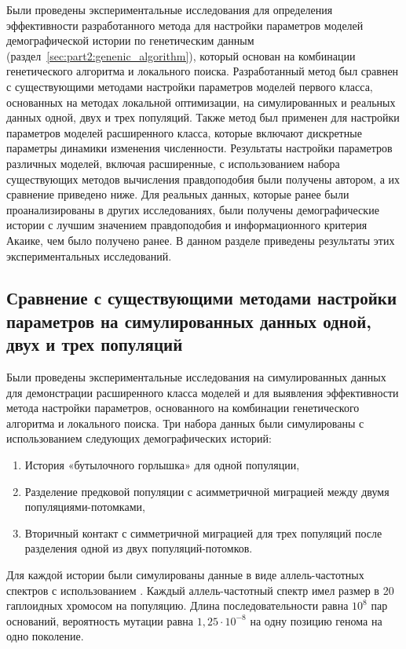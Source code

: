Были проведены экспериментальные исследования для определения эффективности разработанного метода для настройки параметров моделей демографической истории по генетическим данным (раздел~\ref{sec:part2:genenic_algorithm}), который основан на комбинации генетического алгоритма и локального поиска.
Разработанный метод был сравнен с существующими методами настройки параметров моделей первого класса, основанных на методах локальной оптимизации, на симулированных и реальных данных одной, двух и трех популяций.
Также метод был применен для настройки параметров моделей расширенного класса, которые включают дискретные параметры динамики изменения численности.
Результаты настройки параметров различных моделей, включая расширенные, с использованием набора существующих методов вычисления правдоподобия были получены автором, а их сравнение приведено ниже.
Для реальных данных, которые ранее были проанализированы в других исследованиях, были получены демографические истории с лучшим значением правдоподобия и информационного критерия Акаике, чем было получено ранее.
В данном разделе приведены результаты этих экспериментальных исследований.


\subsection{Сравнение с существующими методами настройки параметров на симулированных данных одной, двух и трех популяций}
\label{sec:part2:experiments:genetic_algorithm:simulated_data}

Были проведены экспериментальные исследования на симулированных данных для демонстрации расширенного класса моделей и для выявления эффективности метода настройки параметров, основанного на комбинации генетического алгоритма и локального поиска.
Три набора данных были симулированы с использованием следующих демографических историй:

\begin{enumerate}
    \item История «бутылочного горлышка» для одной популяции,
    \item Разделение предковой популяции с асимметричной миграцией между двумя популяциями-потомками,
    \item Вторичный контакт с симметричной миграцией для трех популяций после разделения одной из двух популяций-потомков.
\end{enumerate}

Для каждой истории были симулированы данные в виде аллель-частотных спектров с использованием \moments.
Каждый аллель-частотный спектр имел размер в 20 гаплоидных хромосом на популяцию.
Длина последовательности равна $10^8$ пар оснований, вероятность мутации равна $1{,}25\cdot10^{-8}$ на одну позицию генома на одно поколение.


